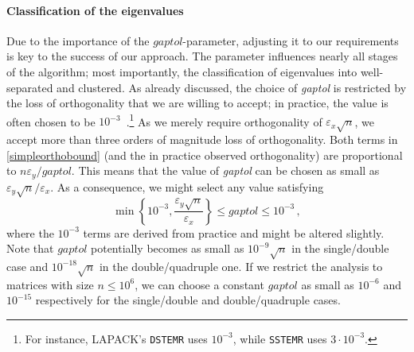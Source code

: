 \documentclass[final]{siamltex}
\begin{document}
\paragraph{Classification of the eigenvalues} Due to the importance of the
$gaptol$-parameter, adjusting it to our requirements is key to the success
of our approach. The parameter influences nearly all stages of the
algorithm; most importantly, the classification of eigenvalues into
well-separated and clustered. As already discussed, the choice of {\it
  gaptol} is restricted by the loss of orthogonality that we are willing to
accept; in practice, the value is often
chosen to be $10^{-3}$~\cite{Dhillon:2004:MRRR}.\footnote{For instance,
  LAPACK's {\tt DSTEMR} uses $10^{-3}$, while {\tt SSTEMR} uses $3 \cdot
  10^{-3}$.} As we merely require 
orthogonality of $\varepsilon_x \sqrt{n}$, we accept
more than three orders of magnitude loss of orthogonality. Both terms in
\eqref{simpleorthobound} (and the in practice observed orthogonality)
are proportional to $n 
\varepsilon_y / gaptol$. This means that the value of {\it gaptol} can be chosen as small as $
 \varepsilon_y \sqrt{n} / \varepsilon_x$. As a consequence, we might select any
 value satisfying
\begin{equation}
 \min\left\{ 10^{-3}, \frac{\varepsilon_y \sqrt{n}}{\varepsilon_x} \right\} \leq gaptol \leq
 10^{-3} \,,
\label{eq:gaptolinterval}
\end{equation}
 where the $10^{-3}$ terms are derived from practice and might be altered slightly.
 Note that $gaptol$ potentially becomes as small
 as $10^{-9} \sqrt{n}$ in the single/double case and $10^{-18} \sqrt{n}$ in the
 double/quadruple one. If we restrict the analysis to matrices with size $n \leq 10^6$, we can
 choose a constant $gaptol$ as small as $10^{-6}$ and $10^{-15}$ 
 respectively for the single/double and double/quadruple cases. 
 
\end{document}
